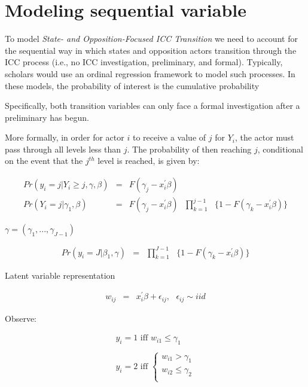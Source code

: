 \section*{Modeling sequential variable}

To model \emph{State- and Opposition-Focused ICC Transition} we need to account for the sequential way in which states and opposition actors transition through the ICC process (i.e., no ICC investigation, preliminary, and formal). Typically, scholars would use an ordinal regression framework to model such processes. In these models, the probability of interest is the cumulative probability  

Specifically, both transition variables can only face a formal investigation after a preliminary has begun.

More formally, in order for actor $i$ to receive a value of $j$ for $Y_{i}$, the actor must pass through all levels less than $j$. The probability of then reaching $j$, conditional on the event that the $j^{th}$ level is reached, is given by: 

\begin{eqnarray}
	Pr(y_{i}={j} | Y_{i} \geq {j}, \gamma, \beta) &=& F(\gamma_{j} - x_{i}^{'}\beta) \nonumber \\
	Pr(Y_{i}={j}|\gamma_{1},\beta) &=& F(\gamma_{j} - x_{i}^{'}\beta)\text{ }\prod^{j-1}_{k=1}\text{ }\{1-F(\gamma_{k}-x_{i}^{'}\beta)\} \nonumber
\end{eqnarray}

$\gamma = (\gamma_{1},...,\gamma_{J-1})$ 

\begin{eqnarray}
	Pr(y_{i}=J|\beta_{1},\gamma) &=&\text{}\prod^{J-1}_{k=1}\text{ }\{1-F(\gamma_{k}-x_{i}^{'}\beta)\} \nonumber
\end{eqnarray}

Latent variable representation

\begin{eqnarray}
	w_{ij} &=& x_{i}^{'}\beta+\epsilon_{ij},\text{ }\epsilon_{ij} \sim iid \nonumber
\end{eqnarray}
	
Observe:

\begin{eqnarray}
	y_{i} = 1\text{ iff } w_{i1} \leq \gamma_{1} \nonumber \\
	\nonumber \\
	y_{i} = 2\text{ iff }
	\begin{cases}
	w_{i1} > \gamma_{1} \nonumber \\
	w_{i2} \leq \gamma_{2} \nonumber \\
\end{cases}
\end{eqnarray}

